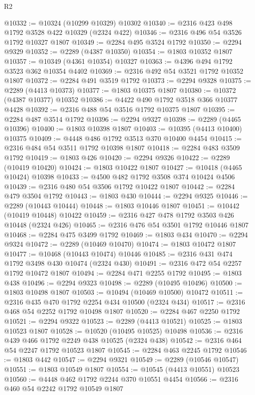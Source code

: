 \begin{lexlean}{R2}
\begin{coremodule}
@10332 := @10324 (@10299 @10329) @10302
@10340 := @2316 @423 @498 @1792 @3528 @422 @10329 (@2324 @422)
@10346 := @2316 @496 @54 @3526 @1792 @10327 @1807
@10349 := @2284 @495 @3524 @1792
@10350 := @2294 @9329
@10352 := @2289 (@4387 @10350)
@10354 := @1803 @10352 @1807
@10357 := @10349 (@4361 @10354) @10327
@10363 := @4396 @494 @1792 @3523 @362 @10354 @4402
@10369 := @2316 @492 @54 @3521 @1792 @10352 @1807
@10372 := @2284 @491 @3519 @1792
@10373 := @2294 @9328
@10375 := @2289 (@4413 @10373)
@10377 := @1803 @10375 @1807
@10380 := @10372 (@4387 @10377) @10352
@10386 := @4422 @490 @1792 @3518 @366 @10377 @4428
@10392 := @2316 @488 @54 @3516 @1792 @10375 @1807
@10395 := @2284 @487 @3514 @1792
@10396 := @2294 @9327
@10398 := @2289 (@4465 @10396)
@10400 := @1803 @10398 @1807
@10403 := @10395 (@4413 @10400) @10375
@10409 := @4448 @486 @1792 @3513 @370 @10400 @4454
@10415 := @2316 @484 @54 @3511 @1792 @10398 @1807
@10418 := @2284 @483 @3509 @1792
@10419 := @1803 @426
@10420 := @2294 @9326
@10422 := @2289 (@10419 @10420)
@10424 := @1803 @10422 @1807
@10427 := @10418 (@4465 @10424) @10398
@10433 := @4500 @482 @1792 @3508 @374 @10424 @4506
@10439 := @2316 @480 @54 @3506 @1792 @10422 @1807
@10442 := @2284 @479 @3504 @1792
@10443 := @1803 @430
@10444 := @2294 @9325
@10446 := @2289 (@10443 @10444)
@10448 := @1803 @10446 @1807
@10451 := @10442 (@10419 @10448) @10422
@10459 := @2316 @427 @478 @1792 @3503 @426 @10448 (@2324 @426)
@10465 := @2316 @476 @54 @3501 @1792 @10446 @1807
@10468 := @2284 @475 @3499 @1792
@10469 := @1803 @434
@10470 := @2294 @9324
@10472 := @2289 (@10469 @10470)
@10474 := @1803 @10472 @1807
@10477 := @10468 (@10443 @10474) @10446
@10485 := @2316 @431 @474 @1792 @3498 @430 @10474 (@2324 @430)
@10491 := @2316 @472 @54 @2257 @1792 @10472 @1807
@10494 := @2284 @471 @2255 @1792
@10495 := @1803 @438
@10496 := @2294 @9323
@10498 := @2289 (@10495 @10496)
@10500 := @1803 @10498 @1807
@10503 := @10494 (@10469 @10500) @10472
@10511 := @2316 @435 @470 @1792 @2254 @434 @10500 (@2324 @434)
@10517 := @2316 @468 @54 @2252 @1792 @10498 @1807
@10520 := @2284 @467 @2250 @1792
@10521 := @2294 @9322
@10523 := @2289 (@4413 @10521)
@10525 := @1803 @10523 @1807
@10528 := @10520 (@10495 @10525) @10498
@10536 := @2316 @439 @466 @1792 @2249 @438 @10525 (@2324 @438)
@10542 := @2316 @464 @54 @2247 @1792 @10523 @1807
@10545 := @2284 @463 @2245 @1792
@10546 := @1803 @442
@10547 := @2294 @9321
@10549 := @2289 (@10546 @10547)
@10551 := @1803 @10549 @1807
@10554 := @10545 (@4413 @10551) @10523
@10560 := @4448 @462 @1792 @2244 @370 @10551 @4454
@10566 := @2316 @460 @54 @2242 @1792 @10549 @1807

\end{coremodule}
\end{lexlean}

